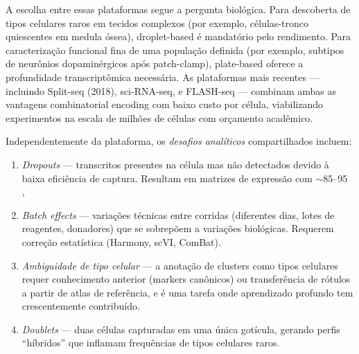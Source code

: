 A escolha entre essas plataformas segue a pergunta biológica. Para descoberta de tipos celulares raros em tecidos complexos (por exemplo, células-tronco quiescentes em medula óssea), droplet-based é mandatório pelo rendimento. Para caracterização funcional fina de uma população definida (por exemplo, subtipos de neurônios dopaminérgicos após patch-clamp), plate-based oferece a profundidade transcriptômica necessária. As plataformas mais recentes --- incluindo Split-seq (2018), sci-RNA-seq, e FLASH-seq --- combinam ambas as vantagens combinatorial encoding com baixo custo por célula, viabilizando experimentos na escala de milhões de células com orçamento acadêmico.

Independentemente da plataforma, os \emph{desafios analíticos} compartilhados incluem:
\begin{enumerate}
  \item \emph{Dropouts} --- transcritos presentes na célula mas não detectados devido à baixa eficiência de captura. Resultam em matrizes de expressão com \(\sim\)85--95\\,\\%
  \item \emph{Batch effects} --- variações técnicas entre corridas (diferentes dias, lotes de reagentes, donadores) que se sobrepõem a variações biológicas. Requerem correção estatística (Harmony, scVI, ComBat).
  \item \emph{Ambiguidade de tipo celular} --- a anotação de clusters como tipos celulares requer conhecimento anterior (markers canônicos) ou transferência de rótulos a partir de atlas de referência, e é uma tarefa onde aprendizado profundo tem crescentemente contribuído.
  \item \emph{Doublets} --- duas células capturadas em uma única gotícula, gerando perfis ``híbridos'' que inflamam frequências de tipos celulares raros.
\end{enumerate}



